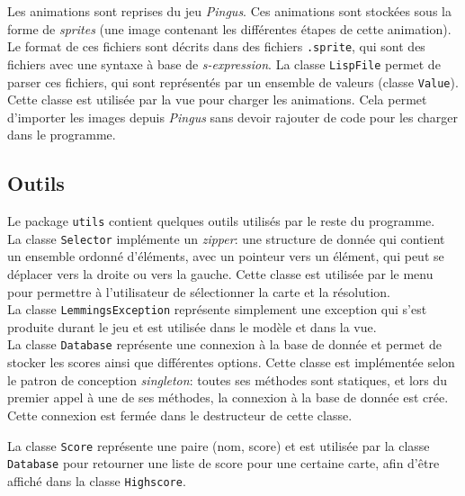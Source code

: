 \documentclass[a4paper,12pt]{article}
\begin{document}
Les animations sont reprises du jeu \emph{Pingus}. Ces
animations sont stockées sous la forme de \emph{sprites}
(une image contenant les différentes étapes de cette
animation). Le format de ces fichiers sont décrits dans des
fichiers \texttt{.sprite}, qui sont des fichiers avec une
syntaxe à base de \emph{s-expression}. La classe
\texttt{LispFile} permet de parser ces fichiers, qui sont
représentés par un ensemble de valeurs (classe
\texttt{Value}). Cette classe est utilisée par la vue pour
charger les animations. Cela permet d'importer les images
depuis \emph{Pingus} sans devoir rajouter de code pour les
charger dans le programme.

\subsection{Outils}
Le package \texttt{utils} contient quelques outils utilisés
par le reste du programme.\\

La classe \texttt{Selector} implémente un \emph{zipper}: une
structure de donnée qui contient un ensemble ordonné
d'éléments, avec un pointeur vers un élément, qui peut
se déplacer vers la droite ou vers la gauche. Cette classe
est utilisée par le menu pour permettre à l'utilisateur de
sélectionner la carte et la résolution.\\

La classe \texttt{LemmingsException} représente simplement
une exception qui s'est produite durant le jeu et est
utilisée dans le modèle et dans la vue.\\

La classe \texttt{Database} représente une connexion à la
base de donnée et permet de stocker les scores ainsi que
différentes options. Cette classe est implémentée selon le
patron de conception \emph{singleton}: toutes ses méthodes
sont statiques, et lors du premier appel à une de ses
méthodes, la connexion à la base de donnée est crée. Cette
connexion est fermée dans le destructeur de cette classe.

La classe \texttt{Score} représente une paire (nom, score)
et est utilisée par la classe \texttt{Database} pour
retourner une liste de score pour une certaine carte, afin
d'être affiché dans la classe \texttt{Highscore}.
\end{document}
